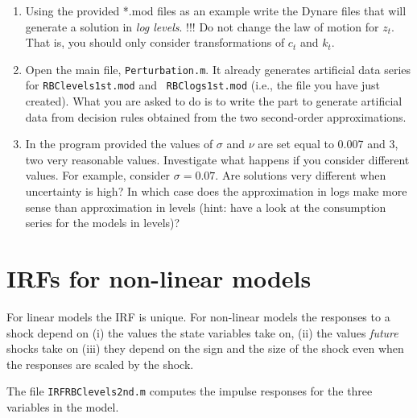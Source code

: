 \documentclass{article}
\begin{document}
\begin{enumerate}
\item Using the provided *.mod files as an example write the Dynare files
that will generate a solution in \emph{log levels}. !!! Do not change the
law of motion for $z_{t}$. That is, you should only consider transformations
of $c_{t}$ and $k_{t}$.

\item Open the main file, \texttt{Perturbation.m}. It already generates
artificial data series for \texttt{RBClevels1st.mod} and \texttt{%
RBClogs1st.mod} (i.e., the file you have just created). What you are asked
to do is to write the part to generate  artificial data from decision rules
obtained from the two second-order approximations.

\item In the program provided the values of $\sigma $ and $\nu $ are set
equal to 0.007 and $3$, two very reasonable values. Investigate what happens
if you consider different values.\newline
For example, consider $\sigma =0.07$. Are solutions very different when
uncertainty is high? In which case does the approximation in logs make more
sense than approximation in levels (hint: have a look at the consumption
series for the models in levels)?
\end{enumerate}

\section{IRFs for non-linear models}

\noindent For linear models the IRF is unique. For non-linear models the
responses to a shock depend on (i) the values the state variables take on,
(ii) the values \emph{future} shocks take on (iii) they depend on the sign
and the size of the shock even when the responses are scaled by the shock. 

The file \texttt{IRFRBClevels2nd.m} computes the impulse responses for the
three variables in the model.
\end{document}
